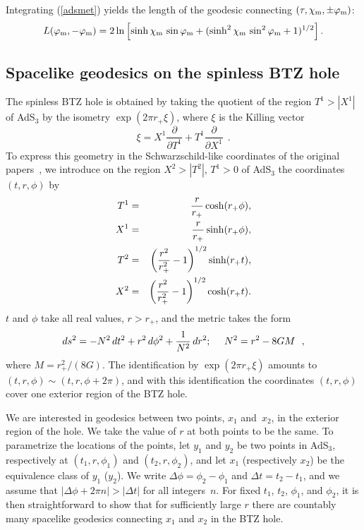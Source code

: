 \documentclass[a4paper,12pt]{article}
\begin{document}
Integrating (\ref{adsmet}) 
yields the length of the geodesic connecting $(\tau,\chi_{{\rm
m}},\pm\varphi_{{\rm m}})$:
% 
\begin{equation} 
L(\varphi_{{\rm m}},-\varphi_{{\rm m}}) = 2 \ln\left[ \sinh\chi_{{\rm m}} \,
\sin\varphi_{{\rm m}} + (\sinh^2\chi_{{\rm m}} \, \sin^2\varphi_{{\rm
m}} + 1)^{1/2} \right]. \label{length1}
\end{equation} 
%

\subsection{Spacelike geodesics on the spinless BTZ hole}
\label{spin0BTZ}


The spinless BTZ hole is obtained by taking the quotient of the region 
$T^1 > |X^1|$ of AdS$_3$ by the isometry $\exp(2\pi r_+ \xi)$, where
$\xi$ is the Killing vector
\begin{equation} 
\label{quot}
\xi = 
X^1 \frac{\partial}{\partial T^1} 
+ 
T^1 \frac{\partial}{\partial X^1} 
\ \ . 
\end{equation}
To express this geometry in the Schwarzschild-like coordinates 
of the original papers~\cite{BTZ}, we introduce on the
region $X^2 > |T^2|$, $T^1 > 0$ of AdS$_3$
the coordinates $(t,r,\phi)$ by 
\begin{eqnarray} 
T^1 &=& {r \over r_+} \cosh(r_+ \phi),  \nonumber \\
X^1 &=& {r \over r_+} \sinh(r_+ \phi), \nonumber \\
T^2 &=& \left( {r^2 \over r_+^2} -1\right)^{1/2} \sinh(r_+ t ),
\nonumber \\ 
X^2 &=& \left( {r^2 \over r_+^2} - 1 \right)^{1/2} \cosh(r_+ t).
\label{nonrot-BTZcoords} 
\end{eqnarray} 
$t$ and $\phi$ take all real values, 
$r > r_+$, and the metric takes the form 
\begin{equation} 
\label{btz}
ds^2 = - N^2 \, dt^2 + r^2 \, d\phi^2 
+ {1 \over N^2} \, dr^2;~~~~ N^2
= r^2 - 8 GM
\ \ , 
\end{equation}
where $M = r_+^2/(8G)$. 
The identification by $\exp(2\pi r_+ \xi)$ amounts to 
$(t,r,\phi) \sim (t,r,\phi+2\pi)$, and with this
identification the coordinates $(t,r,\phi)$ 
cover one exterior region of the BTZ hole. 

We are interested in geodesics between two points, $x_1$ and~$x_2$, 
in the exterior region of the hole. 
We take the value of $r$ at both points to be the 
same. To parametrize the locations of the points, let $y_1$ and $y_2$
be two points in AdS$_3$, respectively at 
$(t_1,r,\phi_1)$ and 
$(t_2,r,\phi_2)$, 
and let $x_1$ (respectively $x_2$) be the
equivalence class of 
$y_1$ ($y_2$). 
We write 
$\Delta\phi = \phi_2 - \phi_1$ and 
$\Delta t = t_2 - t_1$, and we assume that 
$|\Delta \phi+ 2\pi n| > |\Delta t|$ for all
integers~$n$. 
For fixed 
$t_1$, $t_2$,
$\phi_1$, and $\phi_2$, it is then straightforward to show that for
sufficiently large $r$ there 
are countably many spacelike geodesics connecting 
$x_1$ and $x_2$ in the BTZ hole. 
\end{document}
